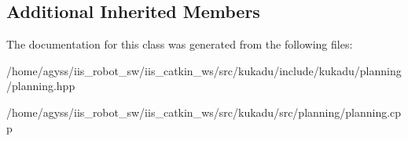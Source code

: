 \subsection*{Additional Inherited Members}


The documentation for this class was generated from the following files\+:\begin{DoxyCompactItemize}
\item 
/home/agyss/iis\+\_\+robot\+\_\+sw/iis\+\_\+catkin\+\_\+ws/src/kukadu/include/kukadu/planning/planning.\+hpp\item 
/home/agyss/iis\+\_\+robot\+\_\+sw/iis\+\_\+catkin\+\_\+ws/src/kukadu/src/planning/planning.\+cpp\end{DoxyCompactItemize}
